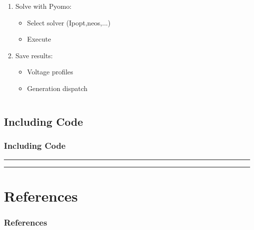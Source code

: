 \documentclass[
	11pt, %
	aspectratio=169, %
]{beamer}
\begin{document}
\begin{frame}
\begin{algorithm}[H]
\begin{columns}[T]
\begin{column}{0.48\textwidth}
\begin{enumerate}
			\item Solve with Pyomo:
			\begin{itemize}
				\item Select solver (Ipopt,neos,...)
				\item Execute
			\end{itemize}

			\item Save results:
			\begin{itemize}
				\item Voltage profiles
				\item Generation dispatch
			\end{itemize}
		\end{enumerate}
		\end{column}
	\end{columns}
	
	\end{algorithm}
	

\end{frame}


\subsection{Including Code}
\begin{frame}[fragile]
	\frametitle{Including Code}

	\rule{\textwidth}{1pt}
	
	\rule{\textwidth}{1pt}

\end{frame}
	


\section{References}


\begin{frame} %
	\frametitle{References}
	
	\printbibliography
	
	
\end{frame}

\end{document}
